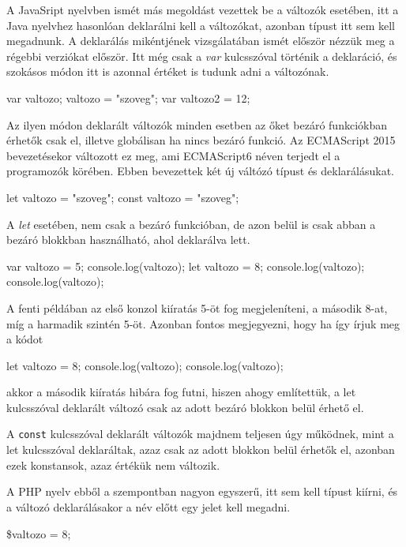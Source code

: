 A JavaSript nyelvben ismét más megoldást vezettek be a változók esetében, itt a Java nyelvhez hasonlóan deklarálni kell a változókat, azonban típust itt sem kell megadnunk. A deklarálás mikéntjének vizsgálatában ismét először nézzük meg a régebbi verziókat először. Itt még csak a \textit{var} kulcsszóval történik a deklaráció, és szokásos módon itt is azonnal értéket is tudunk adni a változónak.
\begin{cpp}
	var valtozo;
	valtozo = "szoveg";
	var valtozo2 = 12;
\end{cpp}
Az ilyen módon deklarált változók minden esetben az őket bezáró funkciókban érhetők csak el, illetve globálisan ha nincs bezáró funkció.
Az ECMAScript 2015 bevezetésekor változott ez meg, ami ECMAScript6 néven terjedt el a programozók körében. Ebben bevezettek két új váltózó típust és deklarálásukat.
\begin{cpp}
	let valtozo = "szoveg";
	const valtozo = "szoveg";
\end{cpp}
A \textit{let} esetében, nem csak a bezáró funkcióban, de azon belül is csak abban a bezáró blokkban használható, ahol deklarálva lett.
\begin{cpp}
	var valtozo = 5;
	console.log(valtozo);
	{
		let valtozo = 8;
		console.log(valtozo);
	}
	console.log(valtozo);
\end{cpp}
A fenti példában az első konzol kiíratás 5-öt fog megjeleníteni, a második 8-at, míg a harmadik szintén 5-öt. Azonban fontos megjegyezni, hogy ha így írjuk meg a kódot
\begin{cpp}
	{
		let valtozo = 8;
		console.log(valtozo);
	}
	console.log(valtozo);
\end{cpp}
akkor a második kiíratás hibára fog futni, hiszen ahogy említettük, a let kulcsszóval deklarált változó csak az adott bezáró blokkon belül érhető el.

A \texttt{const} kulcsszóval deklarált változók majdnem teljesen úgy működnek, mint a let kulcsszóval deklaráltak, azaz csak az adott blokkon belül érhetők el, azonban ezek konstansok, azaz értékük nem változik.


A PHP nyelv ebből a szempontban nagyon egyszerű, itt sem kell típust kiírni, és a változó deklarálásakor a név előtt egy \textdollar jelet kell megadni.
\begin{cpp}
	\$valtozo = 8;	
\end{cpp}

